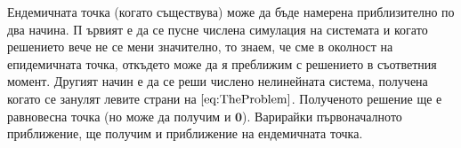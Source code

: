 Ендемичната точка (когато съществува) може да бъде намерена приблизително по два начина. П
ървият е да се пусне числена симулация на системата и когато решението вече не се мени значително, то знаем, че сме в околност на епидемичната точка, откъдето може да я преближим с решението в съответния момент.
Другият начин е да се реши числено нелинейната система, получена когато се занулят левите страни на $\ref{eq:TheProblem}$. Полученото решение ще е равновесна точка (но може да получим и $\mathbf{0}$). Варирайки първоначалното приближение, ще получим и приближение на ендемичната точка.
